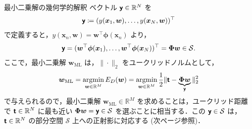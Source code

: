 \documentclass[uplatex,11pt,dvipdfmx,aspectratio=169,unicode,t]{beamer}
\numberwithin{equation}{section}
\newcommand{\BR}{\mathbb{R}}
\newcommand{\CS}{\mathcal{S}}
\newcommand{\tb}[1]{\textbf{#1}}
\newcommand{\ts}[1]{\textsf{#1}}
\newcommand{\bs}[1]{\boldsymbol{#1}}
\newcommand{\1}{\bs{1}}
\newcommand{\0}{\bs{0}}
\newcommand{\norm}[1]{\|#1\|}
\DeclareMathOperator*{\argmin}{argmin}
\begin{document}
\begin{frame}{最小二乗解の幾何学的解釈}
    ベクトル $\tb{\ts{y}} \in \BR^{N}$ を
    \begin{equation}
        \tb{\ts{y}} \coloneqq (y(\bs{x}_{1},\bs{w}),\ldots,y(\bs{x}_{N},\bs{w}))^{\top}
    \end{equation}
    で定義すると，$y(\bs{x}_{n},\bs{w}) = \bs{w}^{\top} \bs{\phi}(\bs{x}_{n})$ より，
    \begin{equation}
        \tb{\ts{y}} = (\bs{w}^{\top} \bs{\phi}(\bs{x}_{1}),\ldots,\bs{w}^{\top} \bs{\phi}(\bs{x}_{N}))^{\top} = \bs{\Phi} \bs{w} \in \CS.
    \end{equation}
    ここで，最小二乗解 $\bs{w}_{\text{ML}}$ は，$\norm{\cdot}_{2}$ をユークリッドノルムとして，
    \begin{equation}
        \bs{w}_{\text{ML}} = \argmin_{\bs{w} \in \BR^{M}} E_{D}(\bs{w}) = \argmin_{\bs{w} \in \BR^{M}} \frac{1}{2} \norm{\tb{\ts{t}} - \underbrace{\bs{\Phi}\bs{w}}_{\tb{\ts{y}}}}_{2}^{2}
    \end{equation}
    で与えられるので，最小二乗解 $\bs{w}_{\text{ML}} \in \BR^{M}$ を求めることは，ユークリッド距離で $\tb{\ts{t}} \in \BR^{N}$ に最も近い $\bs{\Phi} \bs{w} = \tb{\ts{y}} \in \CS$ を選ぶことに相当する．この $\tb{\ts{y}} \in \CS$ は，$\tb{\ts{t}} \in \BR^{N}$ の部分空間 $\CS$ 上への正射影に対応する (次ページ参照)．
\end{frame}
\end{document}
